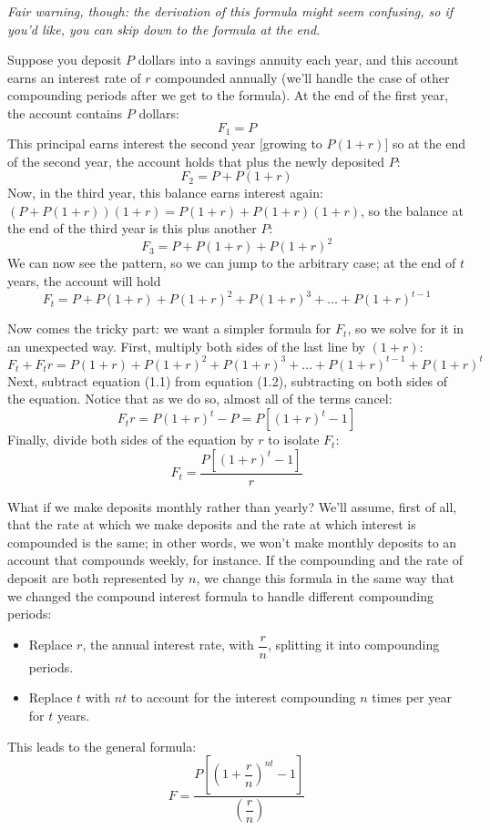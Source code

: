 \textit{Fair warning, though: the derivation of this formula might seem confusing, so if you'd like, you can skip down to the formula at the end.}

Suppose you deposit $P$ dollars into a savings annuity each year, and this account earns an interest rate of $r$ compounded annually (we'll handle the case of other compounding periods after we get to the formula).  At the end of the first year, the account contains $P$ dollars:
\[F_1 = P\]
This principal earns interest the second year [growing to $P(1+r)$] so at the end of the second year, the account holds that plus the newly deposited $P$:
\[F_2 = P+P(1+r)\]
Now, in the third year, this balance earns interest again: $(P+P(1+r))(1+r) = P(1+r) + P(1+r)(1+r)$, so the balance at the end of the third year is this plus another $P$:
\[F_3 = P + P(1+r) + P(1+r)^2\]
We can now see the pattern, so we can jump to the arbitrary case; at the end of $t$ years, the account will hold
\begin{equation}
F_t = P + P(1+r) + P(1+r)^2 + P(1+r)^3 + \ldots + P(1+r)^{t-1}
\end{equation}

Now comes the tricky part: we want a simpler formula for $F_t$, so we solve for it in an unexpected way.  First, multiply both sides of the last line by $(1+r)$:
\begin{equation}
F_t + F_tr = P(1+r) + P(1+r)^2 + P(1+r)^3 + \ldots + P(1+r)^{t-1} + P(1+r)^t
\end{equation}
Next, subtract equation (1.1) from equation (1.2), subtracting on both sides of the equation.  Notice that as we do so, almost all of the terms cancel:
\[F_tr = P(1+r)^t-P = P\left[(1+r)^t-1\right]\]
Finally, divide both sides of the equation by $r$ to isolate $F_t$:
\[F_t = \dfrac{P\left[(1+r)^t-1\right]}{r}\]

What if we make deposits monthly rather than yearly?  We'll assume, first of all, that the rate at which we make deposits and the rate at which interest is compounded is the same; in other words, we won't make monthly deposits to an account that compounds weekly, for instance.  If the compounding and the rate of deposit are both represented by $n$, we change this formula in the same way that we changed the compound interest formula to handle different compounding periods:
\begin{itemize}
\item Replace $r$, the annual interest rate, with $\dfrac{r}{n}$, splitting it into compounding periods.
\item Replace $t$ with $nt$ to account for the interest compounding $n$ times per year for $t$ years.
\end{itemize}
This leads to the general formula:
\[F=\dfrac{P\left[\left(1+\dfrac{r}{n}\right)^{nt}-1\right]}{\left(\dfrac{r}{n}\right)}\]

